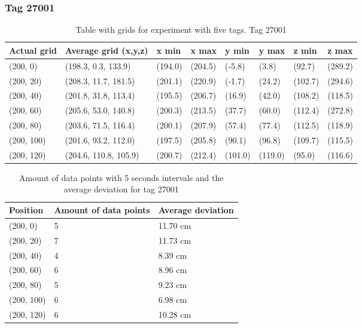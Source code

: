 \subsubsection{Tag 27001}
\begin{table}[H] 
    \centering
    \begin{tabular}{|l|l|l|l|l|l|l|l|}
    \hline
Actual grid & Average grid (x,y,z)   & x min   & x max   & y min    & y max   & z min   & z max    \\ \hline
(200, 0) 	& (198.3, 0.3, 133.9) 	 & (194.0) 	& (204.5)	& (-5.8)	 & (3.8) 	 & (92.7)	 & (289.2)	\\ \hline
(200, 20) 	& (208.3, 11.7, 181.5) 	 & (201.1) 	& (220.9)	& (-1.7)	 & (24.2) 	 & (102.7)	 & (294.6)	\\ \hline
(200, 40) 	& (201.8, 31.8, 113.4) 	 & (195.5) 	& (206.7)	& (16.9)	 & (42.0) 	 & (108.2)	 & (118.5)	\\ \hline
(200, 60) 	& (205.6, 53.0, 140.8) 	 & (200.3) 	& (213.5)	& (37.7)	 & (60.0) 	 & (112.4)	 & (272.8)	\\ \hline
(200, 80) 	& (203.6, 71.5, 116.4) 	 & (200.1) 	& (207.9)	& (57.4)	 & (77.4) 	 & (112.5)	 & (118.9)	\\ \hline
(200, 100) 	& (201.6, 93.2, 112.0) 	 & (197.5) 	& (205.8)	& (90.1)	 & (96.8) 	 & (109.7)	 & (115.5)	\\ \hline
(200, 120) 	& (204.6, 110.8, 105.9)  & (200.7) 	& (212.4)	& (101.0)	 & (119.0) 	 & (95.0)	 & (116.6)	\\ \hline
\end{tabular}
\caption{Table with grids for experiment with five tags. Tag 27001}
\end{table}

\begin{table}[H]
    \centering
    \begin{tabular}{|l|l|l|}
    \hline
    Position   & Amount of data points & Average deviation \\ \hline
    (200, 0)   & 5                     & 11.70 cm                  \\ \hline
    (200, 20)  & 7                     & 11.73 cm                  \\ \hline
    (200, 40)  & 4                     & 8.39 cm                  \\ \hline
    (200, 60)  & 6                     & 8.96 cm                  \\ \hline
    (200, 80)  & 5                     & 9.23 cm                  \\ \hline
    (200, 100) & 6                     & 6.98 cm                  \\ \hline
    (200, 120) & 6                     & 10.28 cm                  \\ \hline
    \end{tabular}
    \caption{Amount of data points with 5 seconds intervals and the average deviation for tag 27001}
\end{table}


